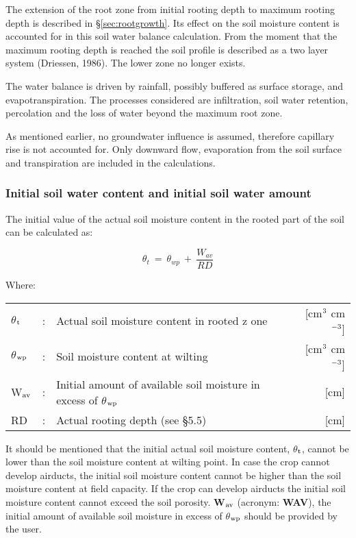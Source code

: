 The extension of the root zone from initial rooting depth to maximum rooting depth is
described in \S \ref{sec:rootgrowth}. Its effect on the soil moisture content is accounted 
for in this soil water
balance calculation. From the moment that the maximum rooting depth is reached the soil
profile is described as a two layer system (Driessen, 1986). The lower zone no longer
exists.

The water balance is driven by rainfall, possibly buffered as surface storage, and
evapotranspiration. The processes considered are infiltration, soil water retention,
percolation and the loss of water beyond the maximum root zone.

As mentioned earlier, no groundwater influence is assumed, therefore capillary rise is not
accounted for. Only downward flow, evaporation from the soil surface and transpiration
are included in the calculations. 

\subsubsection{Initial soil water content and initial soil water amount}

The initial value of the actual soil moisture content in the rooted part of the soil can be
calculated as:

\begin{equation}
\label{eq:6.18}
\theta_{t} ~ =~\theta_{wp} ~+~{\frac{W_{av}}{RD}}
\end{equation}

Where:\\[5pt]
\begin{tabularx}{\textwidth}{llXr}
	$\theta$$_{{\rm t}}$ &:& Actual soil moisture content in rooted z
	one  & [cm$^{{\rm 3}}$ cm$^{{\rm -3}}$]\\
	$\theta$$_{{\rm wp}}$ &:& Soil moisture content at wilting   & [cm$^{{\rm 3}}$ cm$^{{\rm -3}}$]\\
	W$_{{\rm av}}$ &:& Initial amount of available soil moisture 
	in excess of $\theta$$_{{\rm wp}}$ & [cm]\\
	RD &:& Actual rooting depth (see \S 5.5) & [cm]\\
\end{tabularx}

It should be mentioned that the initial actual soil moisture content, $\theta$$_{{\rm t}}$, cannot be lower
than the soil moisture content at wilting point. In case the crop cannot develop airducts,
the initial soil moisture content cannot be higher than the soil moisture content at field
capacity. If the crop can develop airducts the initial soil moisture content cannot exceed
the soil porosity. {\bf W$_{{\rm av}}$} (acronym: {\bf WAV}), the initial amount of available 
soil moisture in excess of $\theta$$_{{\rm wp}}$ should be provided by the user. 

